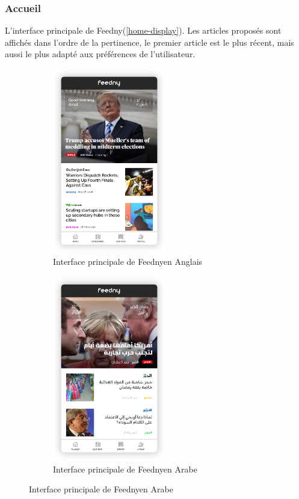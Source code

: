 \subsubsection{Accueil}
L'interface principale de \textquotedbl Feedny\textquotedbl (\autoref{home-display}). Les articles proposés sont affichés dans l'ordre de la pertinence, le premier article est le plus récent, mais aussi le plus adapté aux préférences de l'utilisateur.

\begin{figure}[H]
    \begin{minipage}{0.48\textwidth}
        \begin{figure}[H]
            \centering
            \includegraphics[width=140pt]{img/chapter4/feedny/en-home.png}
            \caption{Interface principale de \textquotedbl Feedny\textquotedbl en Anglais}
            \label{home-display}
        \end{figure}
    \end{minipage}\hfill
    \begin {minipage}{0.48\textwidth}
    \begin{figure}[H]
        \centering
        \includegraphics[width=140pt]{img/chapter4/feedny/ar-home.png}
        \caption{Interface principale de \textquotedbl Feedny\textquotedbl en Arabe}
        \label{}
    \end{figure}
\end{minipage}
\end{figure}


